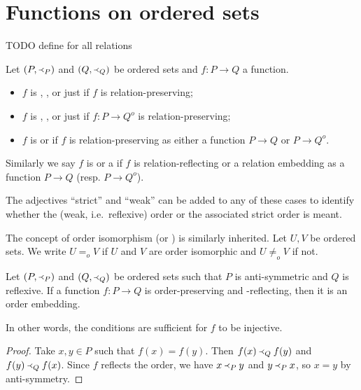 \section{Functions on ordered sets}
TODO define for all relations
\begin{definition}
Let $(P, \Yleft_P)$ and $(Q, \Yleft_Q)$ be ordered sets and $f: P\to Q$ a function.
\begin{itemize}
\item $f$ is , ,  or just  if $f$ is relation-preserving;
\item $f$ is , ,  or just  if $f: P\to Q^o$ is relation-preserving;
\item $f$ is  or  if $f$ is relation-preserving as either a function $P\to Q$ or $P\to Q^o$.
\end{itemize}
Similarly we say $f$ is  or a  if $f$ is relation-reflecting or a relation embedding as a function $P\to Q$ (resp. $P\to Q^o$).

The adjectives ``strict'' and ``weak'' can be added to any of these cases to identify whether the (weak, i.e.\ reflexive) order or the associated strict order is meant.
\end{definition}
The concept of order isomorphism (or ) is similarly inherited. Let $U,V$ be ordered sets. We write $U =_o V$ if $U$ and $V$ are order isomorphic and $U \neq_o V$ if not.

\begin{lemma}
Let $(P, \Yleft_P)$ and $(Q, \Yleft_Q)$ be ordered sets such that $P$ is anti-symmetric and $Q$ is reflexive. If a function $f: P \to Q$ is order-preserving and -reflecting, then it is an order embedding.
\end{lemma}
In other words, the conditions are sufficient for $f$ to be injective.
\begin{proof}
Take $x,y\in P$ such that $f(x) = f(y)$. Then $f(x) \Yleft_Q f(y)$ and $f(y) \Yleft_Q f(x)$. Since $f$ reflects the order, we have $x \Yleft_P y$ and $y \Yleft_P x$, so $x = y$ by anti-symmetry.
\end{proof}


